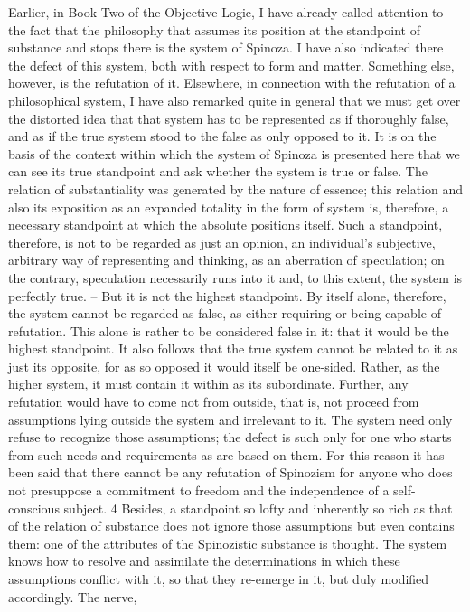 Earlier, in Book Two of the Objective Logic,
I have already called attention to the fact that
the philosophy that assumes its position at the standpoint of
substance and stops there is the system of Spinoza.
I have also indicated there the defect of this system,
both with respect to form and matter.
Something else, however, is the refutation of it.
Elsewhere, in connection with the refutation of a philosophical system,
I have also remarked quite in general that we must get over the distorted
idea that that system has to be represented as if thoroughly false, and as
if the true system stood to the false as only opposed to it. It is on the basis
of the context within which the system of Spinoza is presented here that
we can see its true standpoint and ask whether the system is true or false.
The relation of substantiality was generated by the nature of essence; this
relation and also its exposition as an expanded totality in the form of system
is, therefore, a necessary standpoint at which the absolute positions itself.
Such a standpoint, therefore, is not to be regarded as just an opinion, an
individual’s subjective, arbitrary way of representing and thinking, as an
aberration of speculation; on the contrary, speculation necessarily runs into
it and, to this extent, the system is perfectly true. – But it is not the highest
standpoint. By itself alone, therefore, the system cannot be regarded as false,
as either requiring or being capable of refutation. This alone is rather to
be considered false in it: that it would be the highest standpoint. It also
follows that the true system cannot be related to it as just its opposite, for
as so opposed it would itself be one-sided. Rather, as the higher system, it
must contain it within as its subordinate.
Further, any refutation would have to come not from outside, that is, not
proceed from assumptions lying outside the system and irrelevant to it. The
system need only refuse to recognize those assumptions; the defect is such
only for one who starts from such needs and requirements as are based on
them. For this reason it has been said that there cannot be any refutation of
Spinozism for anyone who does not presuppose a commitment to freedom
and the independence of a self-conscious subject. 4 Besides, a standpoint
so lofty and inherently so rich as that of the relation of substance does not
ignore those assumptions but even contains them: one of the attributes of
the Spinozistic substance is thought. The system knows how to resolve and
assimilate the determinations in which these assumptions conflict with it,
so that they re-emerge in it, but duly modified accordingly. The nerve,
